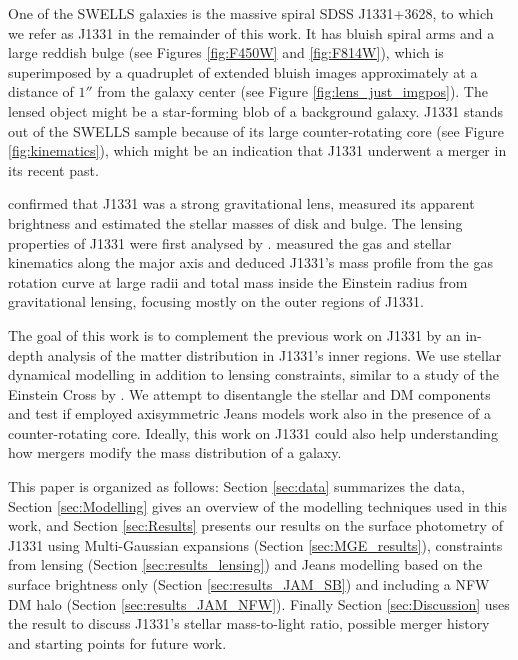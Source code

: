 \documentclass[useAMS,usenatbib]{mnras}
\begin{document}
One of the SWELLS galaxies is the massive spiral SDSS J1331+3628, to which we refer as J1331 in the remainder of this work. It has bluish spiral arms and a large reddish bulge (see Figures \ref{fig:F450W} and \ref{fig:F814W}), which is superimposed by a quadruplet of extended bluish images approximately at a distance of $1''$ from the galaxy center (see Figure \ref{fig:lens_just_imgpos}). The lensed object might be a star-forming blob of a background galaxy. J1331 stands out of the SWELLS sample because of its large counter-rotating core (see Figure \ref{fig:kinematics}), which might be an indication that J1331 underwent a merger in its recent past.

\citet{SWELLSI} confirmed that J1331 was a strong gravitational lens, measured its apparent brightness and estimated the stellar masses of disk and bulge. The lensing properties of J1331 were first analysed by \citet{SWELLSIII}. \citet{SWELLSV} measured the gas and stellar kinematics along the major axis and deduced J1331's mass profile from the gas rotation curve at large radii and total mass inside the Einstein radius from gravitational lensing, focusing mostly on the outer regions of J1331.

The goal of this work is to complement the previous work on J1331 by an in-depth analysis of the matter distribution in J1331's inner regions. We use stellar dynamical modelling in addition to lensing constraints, similar to a study of the Einstein Cross by \citet{GlennEC}. We attempt to disentangle the stellar and DM components and test if employed axisymmetric Jeans models work also in the presence of a counter-rotating core. Ideally, this work on J1331 could also help understanding how mergers modify the mass distribution of a galaxy.

This paper is organized as follows: Section \ref{sec:data} summarizes the data, Section \ref{sec:Modelling} gives an overview of the modelling techniques used in this work, and Section \ref{sec:Results} presents our results on the surface photometry of J1331 using Multi-Gaussian expansions (Section \ref{sec:MGE_results}), constraints from lensing (Section \ref{sec:results_lensing}) and Jeans modelling based on the surface brightness only (Section \ref{sec:results_JAM_SB}) and including a NFW DM halo (Section \ref{sec:results_JAM_NFW}). Finally Section \ref{sec:Discussion} uses the result to discuss J1331's stellar mass-to-light ratio, possible merger history and starting points for future work.
\end{document}
